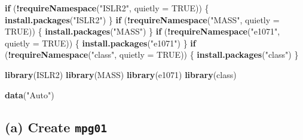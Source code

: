 \documentclass[
]{article}
\newenvironment{Shaded}{\begin{snugshade}}{\end{snugshade}}
\newcommand{\AttributeTok}[1]{\textcolor[rgb]{0.13,0.29,0.53}{#1}}
\newcommand{\ConstantTok}[1]{\textcolor[rgb]{0.56,0.35,0.01}{#1}}
\newcommand{\ControlFlowTok}[1]{\textcolor[rgb]{0.13,0.29,0.53}{\textbf{#1}}}
\newcommand{\DecValTok}[1]{\textcolor[rgb]{0.00,0.00,0.81}{#1}}
\newcommand{\FunctionTok}[1]{\textcolor[rgb]{0.13,0.29,0.53}{\textbf{#1}}}
\newcommand{\NormalTok}[1]{#1}
\newcommand{\OtherTok}[1]{\textcolor[rgb]{0.56,0.35,0.01}{#1}}
\newcommand{\SpecialCharTok}[1]{\textcolor[rgb]{0.81,0.36,0.00}{\textbf{#1}}}
\newcommand{\StringTok}[1]{\textcolor[rgb]{0.31,0.60,0.02}{#1}}
\begin{document}
\begin{Shaded}
\begin{Highlighting}[]
\ControlFlowTok{if}\NormalTok{ (}\SpecialCharTok{!}\FunctionTok{requireNamespace}\NormalTok{(}\StringTok{"ISLR2"}\NormalTok{, }\AttributeTok{quietly =} \ConstantTok{TRUE}\NormalTok{)) \{}
  \FunctionTok{install.packages}\NormalTok{(}\StringTok{"ISLR2"}\NormalTok{)}
\NormalTok{\}}
\ControlFlowTok{if}\NormalTok{ (}\SpecialCharTok{!}\FunctionTok{requireNamespace}\NormalTok{(}\StringTok{"MASS"}\NormalTok{, }\AttributeTok{quietly =} \ConstantTok{TRUE}\NormalTok{)) \{}
  \FunctionTok{install.packages}\NormalTok{(}\StringTok{"MASS"}\NormalTok{)}
\NormalTok{\}}
\ControlFlowTok{if}\NormalTok{ (}\SpecialCharTok{!}\FunctionTok{requireNamespace}\NormalTok{(}\StringTok{"e1071"}\NormalTok{, }\AttributeTok{quietly =} \ConstantTok{TRUE}\NormalTok{)) \{}
  \FunctionTok{install.packages}\NormalTok{(}\StringTok{"e1071"}\NormalTok{)}
\NormalTok{\}}
\ControlFlowTok{if}\NormalTok{ (}\SpecialCharTok{!}\FunctionTok{requireNamespace}\NormalTok{(}\StringTok{"class"}\NormalTok{, }\AttributeTok{quietly =} \ConstantTok{TRUE}\NormalTok{)) \{}
  \FunctionTok{install.packages}\NormalTok{(}\StringTok{"class"}\NormalTok{)}
\NormalTok{\}}

\FunctionTok{library}\NormalTok{(ISLR2)}
\FunctionTok{library}\NormalTok{(MASS)}
\FunctionTok{library}\NormalTok{(e1071)}
\FunctionTok{library}\NormalTok{(class)}

\FunctionTok{data}\NormalTok{(}\StringTok{"Auto"}\NormalTok{)}
\end{Highlighting}
\end{Shaded}

\subsection{\texorpdfstring{(a) Create
\texttt{mpg01}}{(a) Create mpg01}}\label{a-create-mpg01}

\begin{Shaded}
\end{Shaded}
\end{document}
